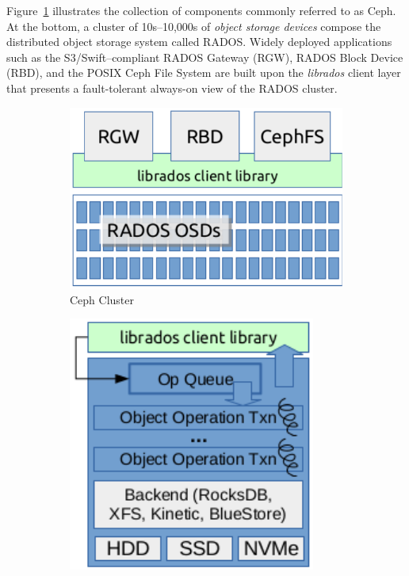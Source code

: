 \documentclass[10pt,twocolumn]{article}
\begin{document}
Figure~\ref{fig:ceph} illustrates the collection of components commonly
referred to as Ceph. At the bottom, a cluster of 10s--10,000s of \emph{object
storage devices} compose the distributed object storage system called RADOS.
Widely deployed applications such as the S3/Swift--compliant RADOS Gateway
(RGW), RADOS Block Device (RBD), and the POSIX Ceph File System are built upon
the \emph{librados} client layer that presents a fault-tolerant always-on view
of the RADOS cluster.

\begin{figure}[t]
  \centering
  \begin{subfigure}[b]{.48\linewidth}
      \centering
      \includegraphics[width=1.0\linewidth]{figures/ceph}
      \caption{Ceph Cluster}
      \label{fig:ceph}
  \end{subfigure}\quad
  \begin{subfigure}[b]{.40\linewidth}
      \centering
      \includegraphics[width=1.0\linewidth]{figures/osd}

\end{subfigure}
\end{figure}
\end{document}

